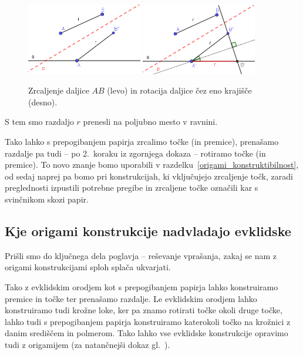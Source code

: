 \begin{dokaz}
    \begin{figure}[h]
        \centering
        \includegraphics[width=0.45\textwidth]{images/zrcaljenje_korak1.png}
        \includegraphics[width=0.45\textwidth]{images/zrcaljenje_korak2.png}
        \caption[Prenašanje razdalj z origamijem po korakih]{Zrcaljenje daljice $AB$ (levo) in rotacija daljice čez eno krajišče (desno).}
        \label{fig:prenos_razdalje_koraki}
    \end{figure}

    S tem smo razdaljo $r$ prenesli na poljubno mesto v ravnini.
\end{dokaz}

Tako lahko s prepogibanjem papirja zrcalimo točke (in premice), prenašamo razdalje pa tudi -- po 2.\ koraku iz zgornjega dokaza -- rotiramo točke (in premice). To novo znanje bomo uporabili v razdelku~\ref{origami_konstruktibilnost}, od sedaj naprej pa bomo pri konstrukcijah, ki vključujejo zrcaljenje točk, zaradi preglednosti izpustili potrebne pregibe in zrcaljene točke označili kar s svinčnikom skozi papir.

\subsection{Kje origami konstrukcije nadvladajo evklidske}
\label{podpogl:nadvlada_origamija}

Prišli smo do ključnega dela poglavja -- reševanje vprašanja, zakaj se nam z origami konstrukcijami sploh splača ukvarjati.

Tako z evklidskim orodjem kot s prepogibanjem papirja lahko konstruiramo premice in točke ter prenašamo razdalje. Le evklidskim orodjem lahko konstruiramo tudi krožne loke, ker pa znamo rotirati točke okoli druge točke, lahko tudi s prepogibanjem papirja konstruiramo katerokoli točko na krožnici z danim središčem in polmerom. Tako lahko vse evklidske konstrukcije opravimo tudi z origamijem (za natančnejši dokaz gl.\ \cite{robert1995}).

